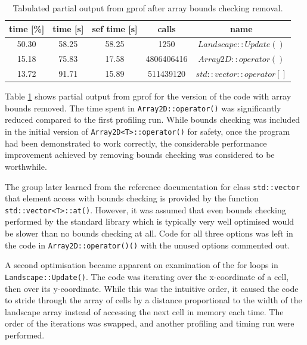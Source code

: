\begin{table}[h!]
\caption{Tabulated partial output from gprof after array bounds checking removal.}
\label{tab:profile2}
\begin{center}
\begin{tabular}{|c|c|c|c|c|}
\hline
time [\%] & time [s] & sef time [s] & calls & name\\
\hline
50.30 & 58.25 & 58.25 & 1250 & $Landscape::Update()$\\
\hline
15.18 & 75.83 & 17.58 & 4806406416 & $Array2D::operator()$\\
\hline
13.72 & 91.71 & 15.89 & 511439120 & $std::vector::operator[]$\\
\hline
\end{tabular}
\end{center}
\end{table}

Table \ref{tab:profile2} shows partial output from gprof for the version of the code with array bounds removed.
The time spent in \texttt{Array2D::operator()} was significantly reduced compared to the first profiling run.
While bounds checking was included in the initial version of \texttt{Array2D<T>::operator()} for safety, once the program had been demonstrated to work correctly, the considerable performance improvement achieved by removing bounds checking was considered to be worthwhile.

The group later learned from the reference documentation for class \texttt{std::vector} that element access with bounds checking is provided by the function \texttt{std::vector<T>::at()}.
However, it was assumed that even bounds checking performed by the standard library which is typically very well optimised would be slower than no bounds checking at all.
Code for all three options was left in the code in \texttt{Array2D::operator()()} with the unused options commented out.

A second optimisation became apparent on examination of the for loops in \texttt{Landscape::Update()}.
The code was iterating over the x-coordinate of a cell, then over its y-coordinate.
While this was the intuitive order, it caused the code to stride through the array of cells by a distance proportional to the width of the landscape array instead of accessing the next cell in memory each time.
The order of the iterations was swapped, and another profiling and timing run were performed.

